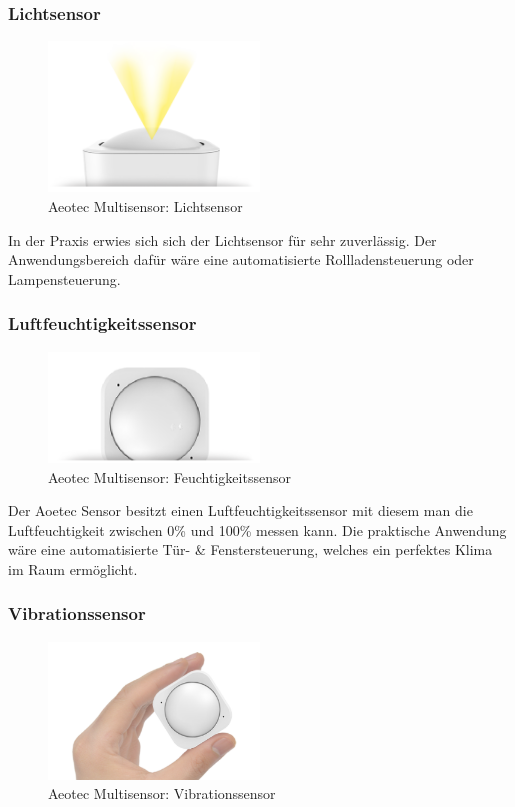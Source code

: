 \subsubsection{Lichtsensor}
\begin{figure}[h!]
	\centering
	\includegraphics[width=0.5\textwidth]{img/Sensorevaluation/AeoLight.png}
	\caption{Aeotec Multisensor: Lichtsensor}
	\label{fig:sensorenAeoLight}
\end{figure}

In der Praxis erwies sich sich der Lichtsensor für sehr zuverlässig. Der Anwendungsbereich dafür wäre eine automatisierte Rollladensteuerung oder Lampensteuerung.

\subsubsection{Luftfeuchtigkeitssensor}
\begin{figure}[h!]
	\centering
	\includegraphics[width=0.5\textwidth]{img/Sensorevaluation/AeoHum.png}
	\caption{Aeotec Multisensor: Feuchtigkeitssensor}
	\label{fig:sensorenAeoHum}
\end{figure}

Der Aoetec Sensor besitzt einen Luftfeuchtigkeitssensor mit diesem man die Luftfeuchtigkeit zwischen 0\% und 100\% messen kann. Die praktische Anwendung wäre eine automatisierte Tür- \& Fenstersteuerung, welches ein perfektes Klima im Raum ermöglicht.

\newpage
\subsubsection{Vibrationssensor}
\begin{figure}[h!]
	\centering
	\includegraphics[width=0.5\textwidth]{img/Sensorevaluation/AeoVib.png}
	\caption{Aeotec Multisensor: Vibrationssensor}
	\label{fig:sensorenAeoVib}
\end{figure}

